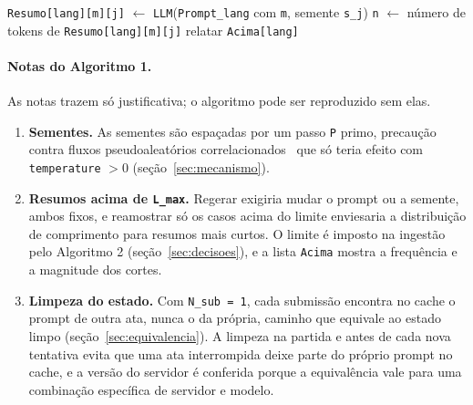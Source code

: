 \documentclass[12pt]{article}
\begin{document}
\begin{algorithm}[H]
{{{      
      \texttt{Resumo[lang][m][j]} $\gets$ \texttt{LLM}(\texttt{Prompt\_lang}
      com \texttt{m}, semente \texttt{s\_j})\;
      \texttt{n} $\gets$ número de tokens de \texttt{Resumo[lang][m][j]}\;
    }
  }
  relatar \texttt{Acima[lang]}\;
}
\end{algorithm}

\paragraph{Notas do Algoritmo 1.} As notas trazem só justificativa; o
algoritmo pode ser reproduzido sem elas.

{\renewcommand{\theenumi}{\roman{enumi}}
\renewcommand{\labelenumi}{(\theenumi)}
\begin{enumerate}
\item \textbf{Sementes.} As sementes são espaçadas por um passo \texttt{P} primo,
  precaução contra fluxos pseudoaleatórios correlacionados~\cite{lecuyer2002}
  que só teria efeito com \texttt{temperature} $> 0$
  (seção~\ref{sec:mecanismo}).
\item \textbf{Resumos acima de \texttt{L\_max}.} Regerar exigiria mudar o
  prompt ou a semente, ambos fixos, e reamostrar só os casos acima do limite
  enviesaria a distribuição de comprimento para resumos mais curtos. O limite é
  imposto na ingestão pelo Algoritmo 2 (seção~\ref{sec:decisoes}), e a lista
  \texttt{Acima} mostra a frequência e a magnitude dos cortes.
\item \textbf{Limpeza do estado.} Com \texttt{N\_sub = 1}, cada submissão
  encontra no cache o prompt de outra ata, nunca o da própria, caminho que
  equivale ao estado limpo (seção~\ref{sec:equivalencia}). A limpeza na partida
  e antes de cada nova tentativa evita que uma ata interrompida deixe parte do
  próprio prompt no cache, e a versão do servidor é conferida porque a
  equivalência vale para uma combinação específica de servidor e modelo.
\end{enumerate}}
\end{document}
